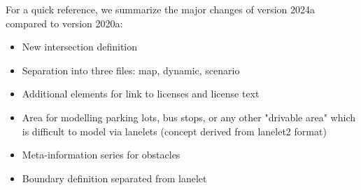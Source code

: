 For a quick reference, we summarize the major changes of version 2024a compared to version 2020a:
\begin{itemize}
\item New intersection definition
\item Separation into three files: map, dynamic, scenario 
\item Additional elements for link to licenses and license text
\item Area for modelling parking lots, bus stops, or any other "drivable area" which is difficult to model via lanelets (concept derived from lanelet2 format)
\item Meta-information series for obstacles
\item Boundary definition separated from lanelet 
\end{itemize}

